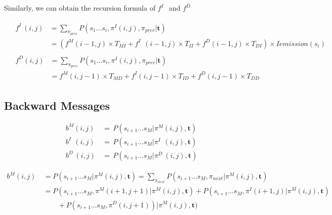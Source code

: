 \documentclass[10pt]{article}
\begin{document}
    Similarly, we can obtain the recursion formula of $f^{I\;\;}$ and $f^{D\;}$

    \begin{align}
      &\begin{aligned}
        f^{I\;}(i, j) &= \sum\nolimits_{\pi_{prev}} P(s_1...s_{i}, \pi^{I}(i, j), \pi_{prev} | \mathbf{t}) \\
                    &= (f^{M}(i-1, j) \times T_{MI}  + f^{I\;\;}(i-1, j) \times T_{II} + f^{D}(i-1, j) \times T_{DI}) \times Iemission(s_{i})
      \end{aligned} \\
      &\begin{aligned}
        f^{D}(i, j) &= \sum\nolimits_{\pi_{prev}} P(s_1...s_{i}, \pi^{I}(i, j), \pi_{prev} | \mathbf{t}) \\
                    &= f^{M}(i, j-1) \times T_{MD}  + f^{I}(i, j-1) \times T_{ID} + f^{D}(i, j-1) \times T_{DD}
      \end{aligned}
    \end{align}

  \subsection{Backward Messages}
    \begin{equation}
    \begin{aligned}
      b^{M}(i, j) \,&=\, P(s_{i+1}...s_M | \pi^M(i, j), \mathbf{t}) \\
      b^{I\;\;}(i, j) \,&=\, P(s_{i+1}...s_M | \pi^{I\;\;}(i, j), \mathbf{t}) \\
      b^{D\;}(i, j) \,&=\, P(s_{i+1}...s_M | \pi^{D\;}(i, j), \mathbf{t})
    \end{aligned}
    \end{equation}

    \begin{equation} \label{eq121}
    \begin{aligned}
      b^M(i, j) \
        &= P(s_{i+1}...s_M | \pi^{M}(i, j), \mathbf{t}) = \sum\nolimits_{\pi_{next}} P(s_{i+1}...s_M, \pi_{next} | \pi^{M}(i, j), \mathbf{t}) \\
        &= P(s_{i+1}...s_M, \pi^M(i+1, j+1) | \pi^M(i, j), \mathbf{t}) + P(s_{i+1}...s_M, \pi^{I}(i+1, j) | \pi^M(i, j), \mathbf{t})  \\
        &\qquad + P(s_{i+1}...s_M, \pi^{D}(i, j+1)) | \pi^M(i, j), \mathbf{t})
    \end{aligned}
    \end{equation}
\end{document}
